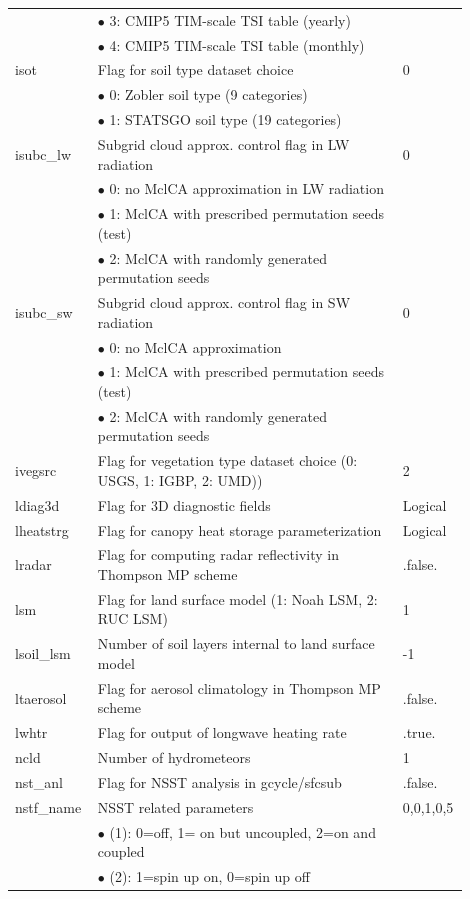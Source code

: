 \documentclass[11pt,fleqn]{report}              %
\begin{document}
\begin{enumerate}
{\begin{longtable}{p{0.17\linewidth} | p{0.65\linewidth} | p{0.08\linewidth} }
& $\bullet$ 3: CMIP5 TIM-scale TSI table (yearly) & \\
& $\bullet$ 4: CMIP5 TIM-scale TSI table (monthly) & \\
isot & Flag for soil type dataset choice & 0 \\
& $\bullet$ 0: Zobler soil type (9 categories) & \\
& $\bullet$ 1: STATSGO soil type (19 categories) & \\
isubc\_lw & Subgrid cloud approx. control flag in LW radiation & 0 \\
& $\bullet$ 0: no MclCA approximation in LW radiation & \\
& $\bullet$ 1: MclCA with prescribed permutation seeds (test) & \\
& $\bullet$ 2: MclCA with randomly generated permutation seeds & \\
isubc\_sw & Subgrid cloud approx. control flag in SW radiation & 0 \\
& $\bullet$ 0: no MclCA approximation & \\
& $\bullet$ 1: MclCA with prescribed permutation seeds (test) & \\
& $\bullet$ 2: MclCA with randomly generated permutation seeds & \\
ivegsrc & Flag for vegetation type dataset choice (0: USGS, 1: IGBP, 2: UMD)) & 2 \\
ldiag3d & Flag for 3D diagnostic fields & Logical \\
lheatstrg & Flag for canopy heat storage parameterization  & Logical \\
lradar & Flag for computing radar reflectivity in Thompson MP scheme & .false. \\
lsm & Flag for land surface model (1: Noah LSM, 2: RUC LSM) & 1 \\
lsoil\_lsm & Number of soil layers internal to land surface model & -1 \\
ltaerosol & Flag for aerosol climatology in Thompson MP scheme & .false. \\
lwhtr & Flag for output of longwave heating rate & .true. \\
ncld & Number of hydrometeors & 1 \\
nst\_anl & Flag for NSST analysis in gcycle/sfcsub & .false. \\
nstf\_name & NSST related parameters & 0,0,1,0,5 \\
& $\bullet$ (1): 0=off, 1= on but uncoupled, 2=on and coupled & \\
& $\bullet$ (2): 1=spin up on, 0=spin up off & \\

\end{longtable}}
\end{enumerate}
\end{document}
